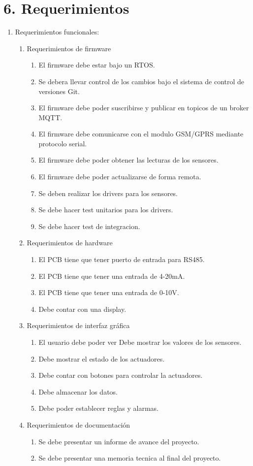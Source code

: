 \documentclass[
11pt, %
codirector, %
]{charter}
\begin{document}
\section{6. Requerimientos}
\label{sec:requerimientos}
\begin{enumerate}
	\item Requerimientos funcionales:
		\begin{enumerate}
			\item Requerimientos de firmware
			\begin{enumerate} 
				\item El firmware debe estar bajo un RTOS.
				\item Se debera llevar control de los cambios bajo el sistema de control de versiones Git.
				\item El firmware debe poder suscribirse y publicar en topicos de un broker MQTT.
				\item El firmware debe comunicarse con el modulo GSM/GPRS mediante protocolo serial.
				\item El firmware debe poder obtener las lecturas de los sensores.
				\item El firmware debe poder actualizarse de forma remota.
				\item Se deben realizar los drivers para los sensores.
				\item Se debe hacer test unitarios para los drivers.
				\item Se debe hacer test de integracion.
			\end{enumerate}
			\item Requerimientos de hardware
			\begin{enumerate} 
				\item El PCB tiene que tener puerto de entrada para RS485.
				\item El PCB tiene que tener una entrada de 4-20mA.
				\item El PCB tiene que tener una entrada de 0-10V.
				\item Debe contar con una display.
			\end{enumerate}			
			\item Requerimientos de interfaz gráfica
			\begin{enumerate} 
				\item El usuario debe poder ver Debe mostrar los valores de los sensores.
				\item Debe mostrar el estado de los actuadores.
				\item Debe contar con botones para controlar la actuadores.
				\item Debe almacenar los datos.
				\item Debe poder establecer reglas y alarmas. 
			\end{enumerate}
			\item Requerimientos de documentación
			\begin{enumerate} 
				\item Se debe presentar un informe de avance del proyecto.
				\item Se debe presentar una memoria tecnica al final del proyecto.
			\end{enumerate}
		\end{enumerate}


\end{enumerate}
\end{document}
